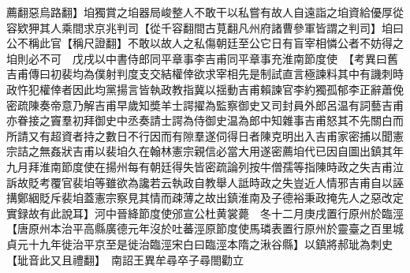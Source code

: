 薦翻惡烏路翻】垍獨賞之垍器局峻整人不敢干以私嘗有故人自遠詣之垍資給優厚從容欵狎其人乘間求京兆判司【從千容翻間古莧翻凡州府諸曹參軍皆謂之判司】垍曰公不稱此官【稱尺證翻】不敢以故人之私傷朝廷至公它日有盲宰相憐公者不妨得之垍則必不可　戊戌以中書侍郎同平章事李吉甫同平章事充淮南節度使　【考異曰舊吉甫傳曰初裴均為僕射判度支交結權倖欲求宰相先是制試直言極諫料其中有譏刺時政忤犯權倖者因此均黨揚言皆執政教指冀以揺動吉甫賴諫官李約獨孤郁李正辭蕭俛密疏陳奏帝意乃解吉甫早歲知奬羊士諤擢為監察御史又司封員外郎呂温有詞藝吉甫亦眷接之竇羣初拜御史中丞奏請士諤為侍御史温為郎中知雜事吉甫怒其不先關白而所請又有超資者持之數日不行因而有隙羣遂伺得日者陳克明出入吉甫家密捕以聞憲宗詰之無姦狀吉甫以裴垍久在翰林憲宗親信必當大用遂密薦垍代已因自圖出鎮其年九月拜淮南節度使在揚州每有朝廷得失皆密疏論列按牛僧孺等指陳時政之失吉甫泣訴故貶考覆官裴垍等雖欲為讒若云執政自教舉人詆時政之失豈近人情邪吉甫自以誣搆鄭絪貶斥裴垍蓋憲宗察見其情而疎薄之故出鎮淮南及子德裕秉政掩先人之惡改定實録故有此說耳】河中晉絳節度使邠宣公杜黄裳薨　冬十二月庚戌置行原州於臨涇【唐原州本治平高縣廣德元年沒於吐蕃涇原節度使馬璘表置行原州於靈臺之百里城貞元十九年徙治平京至是徙治臨涇宋白曰臨涇本隋之湫谷縣】以鎮將郝玼為刺史【玼音此又且禮翻】　南詔王異牟尋卒子尋閤勸立

